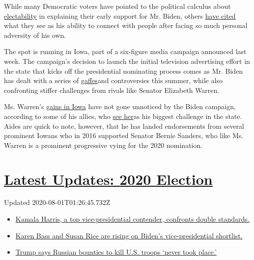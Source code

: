 While many Democratic voters have pointed to the political calculus
about
\href{https://www.nytimes.com/2019/08/22/us/politics/joe-biden-trump-2020.html}{electability}
in explaining their early support for Mr. Biden, others
\href{https://www.nytimes.com/2019/05/30/us/politics/joe-biden-beau-biden-death.html}{have
cited} what they see as his ability to connect with people after facing
so much personal adversity of his own.

The spot is running in Iowa, part of a six-figure media campaign
announced last week. The campaign's decision to launch the initial
television advertising effort in the state that kicks off the
presidential nominating process comes as Mr. Biden has dealt with a
series of
\href{https://www.nytimes.com/2019/08/12/us/politics/joe-biden-gaffes.html}{gaffes}and
controversies this summer, while also confronting stiffer challenges
from rivals like Senator Elizabeth Warren.

Ms. Warren's
\href{https://www.monmouth.edu/polling-institute/reports/monmouthpoll_IA_080819/}{gains
in Iowa} have not gone unnoticed by the Biden campaign, according to
some of his allies, who
\href{https://www.nytimes.com/2019/08/22/us/politics/joe-biden-trump-2020.html}{see
her}as his biggest challenge in the state. Aides are quick to note,
however, that he has landed endorsements from several prominent Iowans
who in 2016 supported Senator Bernie Sanders, who like Ms. Warren is a
prominent progressive vying for the 2020 nomination.

\hypertarget{latest-updates-2020-election}{%
\section{\texorpdfstring{\href{https://www.nytimes.com/2020/07/31/us/elections/biden-vs-trump.html?action=click\&pgtype=Article\&state=default\&region=MAIN_CONTENT_1\&context=storylines_live_updates}{Latest
Updates: 2020
Election}}{Latest Updates: 2020 Election}}\label{latest-updates-2020-election}}

Updated 2020-08-01T01:26:45.732Z

\begin{itemize}
\tightlist
\item
  \href{https://www.nytimes.com/2020/07/31/us/elections/biden-vs-trump.html?action=click\&pgtype=Article\&state=default\&region=MAIN_CONTENT_1\&context=storylines_live_updates\#link-29fdff45}{Kamala
  Harris, a top vice-presidential contender, confronts double
  standards.}
\item
  \href{https://www.nytimes.com/2020/07/31/us/elections/biden-vs-trump.html?action=click\&pgtype=Article\&state=default\&region=MAIN_CONTENT_1\&context=storylines_live_updates\#link-13ec3d9c}{Karen
  Bass and Susan Rice are rising on Biden's vice-presidential
  shortlist.}
\item
  \href{https://www.nytimes.com/2020/07/31/us/elections/biden-vs-trump.html?action=click\&pgtype=Article\&state=default\&region=MAIN_CONTENT_1\&context=storylines_live_updates\#link-49e9a016}{Trump
  says Russian bounties to kill U.S. troops `never took place.'}
\end{itemize}


